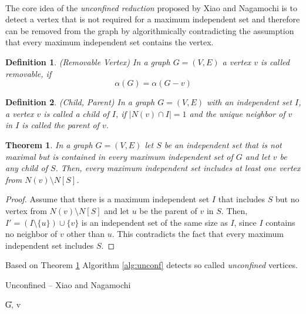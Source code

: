 \documentclass[12pt,a4paper,twoside]{scrartcl}
\newtheorem{theorem}{Theorem}
\newtheorem{definition}{Definition}
\numberwithin{equation}{section}
\begin{document}
\paragraph{}
The core idea of the \textit{unconfined reduction} proposed by Xiao and Nagamochi \cite{XiaoNagamochi} is to detect a vertex that is not required for a maximum independent set and therefore can be removed from the graph by algorithmically contradicting the assumption that every maximum independent set contains the vertex.

\begin{definition} (Removable Vertex)
	In a graph $G=(V,E)$ a vertex $v$ is called removable, if 
	\[\alpha(G) = \alpha(G-v)\]
\end{definition}

\begin{definition} (Child, Parent) In a graph $G=(V,E)$ with an \textit{independent set} $I$, a vertex $v$ is called a child of $I$, if $|N(v)\cap I| = 1$ and the unique neighbor of $v$ in $I$ is called the parent of $v$.
\end{definition}

\begin{theorem} \label{unconfined}
	In a graph $G=(V,E)$ let $S$ be an independent set that is not maximal but is contained in every maximum independent set of $G$ and let $v$ be any child of $S$. Then, every maximum independent set includes at least one vertex from $N(v)\setminus N[S]$.
\end{theorem}
\begin{proof}
	Assume that there is a maximum independent set $I$ that includes $S$ but no vertex from $N(v)\setminus N[S]$ and let $u$ be the parent of $v$ in $S$. Then, $I'=(I\setminus\{u\})\cup\{v\}$ is an independent set of the same size as $I$, since $I$ contains no neighbor of $v$ other than $u$. This contradicts the fact that every maximum independent set includes $S$.
\end{proof}

Based on Theorem \ref{unconfined} Algorithm \ref{alg:unconf} detects so called \textit{unconfined} vertices.

\begin{algorithm}
	\caption{Unconfined -- Xiao and Nagamochi \cite{XiaoUnconfined}}\label{alg:unconf}
	\DontPrintSemicolon
	
	\U{G, v}	
	
	
\end{algorithm}
\end{document}
